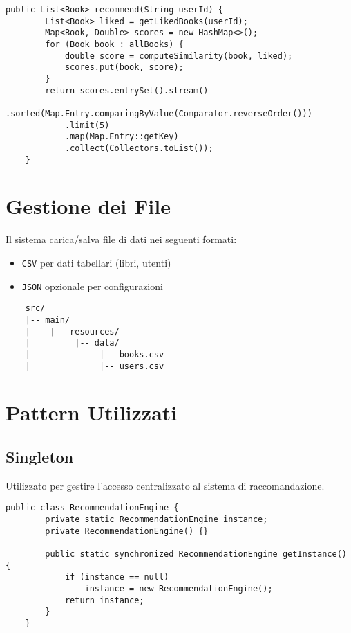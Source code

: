 \documentclass[a4paper,12pt]{article}
\begin{document}
    \begin{lstlisting}[caption={Algoritmo semplificato di raccomandazione}]
    public List<Book> recommend(String userId) {
        List<Book> liked = getLikedBooks(userId);
        Map<Book, Double> scores = new HashMap<>();
        for (Book book : allBooks) {
            double score = computeSimilarity(book, liked);
            scores.put(book, score);
        }
        return scores.entrySet().stream()
            .sorted(Map.Entry.comparingByValue(Comparator.reverseOrder()))
            .limit(5)
            .map(Map.Entry::getKey)
            .collect(Collectors.toList());
    }
    \end{lstlisting}

    \section{Gestione dei File}
    Il sistema carica/salva file di dati nei seguenti formati:
    \begin{itemize}
    \item \texttt{CSV} per dati tabellari (libri, utenti)
    \item \texttt{JSON} opzionale per configurazioni
    \end{itemize}

    \begin{verbatim}
    src/
    |-- main/
    |    |-- resources/
    |         |-- data/
    |              |-- books.csv
    |              |-- users.csv
    \end{verbatim}

    \section{Pattern Utilizzati}
    \subsection{Singleton}
    Utilizzato per gestire l'accesso centralizzato al sistema di raccomandazione.
    \begin{lstlisting}[caption={Pattern Singleton per RecommendationEngine}]
    public class RecommendationEngine {
        private static RecommendationEngine instance;
        private RecommendationEngine() {}

        public static synchronized RecommendationEngine getInstance() {
            if (instance == null)
                instance = new RecommendationEngine();
            return instance;
        }
    }
    \end{lstlisting}
\end{document}
